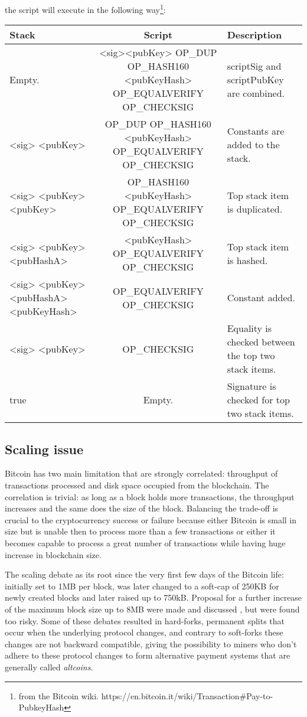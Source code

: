 		the script will execute in the following way\footnote{from the Bitcoin wiki. https://en.bitcoin.it/wiki/Transaction\#Pay-to-PubkeyHash}:
		\begin{center}
			\begin{tabulary}{\textwidth}{|L|C|L|}
			\hline
			\textbf{Stack} & \textbf{Script} & \textbf{Description} \\ \hline
			Empty. & <sig><pubKey> OP\_DUP OP\_HASH160 <pubKeyHash> OP\_EQUALVERIFY OP\_CHECKSIG & scriptSig and scriptPubKey are combined. \\ \hline
			<sig> <pubKey> & OP\_DUP OP\_HASH160 <pubKeyHash> OP\_EQUALVERIFY OP\_CHECKSIG & Constants are added to the stack. \\ \hline
			<sig> <pubKey> <pubKey> & OP\_HASH160 <pubKeyHash> OP\_EQUALVERIFY OP\_CHECKSIG & Top stack item is duplicated. \\ \hline
			<sig> <pubKey> <pubHashA> & <pubKeyHash> OP\_EQUALVERIFY OP\_CHECKSIG & Top stack item is hashed. \\ \hline
			<sig> <pubKey> <pubHashA> <pubKeyHash> & OP\_EQUALVERIFY OP\_CHECKSIG & Constant added. \\ \hline
			<sig> <pubKey> & OP\_CHECKSIG & Equality is checked between the top two stack items. \\ \hline
			true & Empty. & Signature is checked for top two stack items. \\
			\hline
			\end{tabulary}
		\end{center}
		
		\subsection{Scaling issue}
		
		Bitcoin has two main limitation that are strongly correlated: throughput of transactions processed and disk space occupied from the blockchain. The correlation is trivial: as long as a block holds more transactions, the throughput increases and the same does the size of the block. Balancing the trade-off is crucial to the cryptocurrency success or failure because either Bitcoin is small in size but is unable then to process more than a few transactions or either it becomes capable to process a great number of transactions while having huge increase in blockchain size. 
		
		The scaling debate as its root since the very first few days of the Bitcoin life: initially set to 1MB per block, was later changed to a soft-cap of 250KB for newly created blocks and later raised up to 750kB. Proposal for a further increase of the maximum block size up to 8MB were made and discussed \cite{BlocksizeIncrease2015}, but were found too risky. Some of these debates resulted in hard-forks, permanent splits that occur when the underlying protocol changes, and contrary to soft-forks these changes are not backward compatible, giving the possibility to miners who don't adhere to these protocol changes to form alternative payment systems that are generally called \textit{altcoins}.
		
